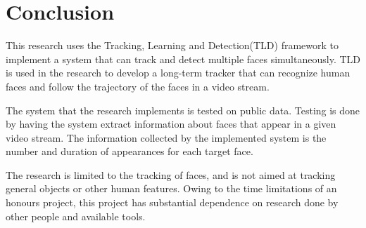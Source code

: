 \section{Conclusion}
This research uses the Tracking, Learning and Detection(TLD) framework to implement a system that can track and detect multiple faces simultaneously.
TLD is used in the research to develop a long-term tracker that can recognize human faces and follow the trajectory of the faces in a video stream.

The system that the research implements is tested on public data.
Testing is done by having the system extract information about faces that appear in a given video stream.
The information collected by the implemented system is the number and duration of appearances for each target face. 

The research is limited to the tracking of faces, and is not aimed at tracking general objects or other human features.
Owing to the time limitations of an honours project, this project has substantial dependence on research done by other people and available tools.
